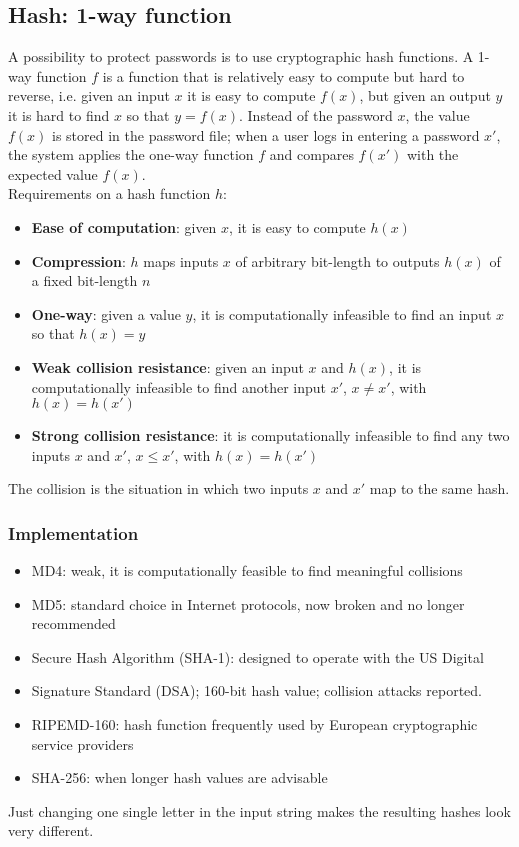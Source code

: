 \documentclass[a4paper, 10pt, titlepage]{article}
\begin{document}
\subsection{Hash: 1-way function}
A possibility to protect passwords is to use cryptographic hash functions. A 1-way function $f$ is a function that is relatively easy to compute but hard to reverse, i.e. given an input $x$ it is easy to compute $f(x)$, but given an output $y$ it is hard to find $x$ so that $y = f(x)$. Instead of the password $x$, the value $f(x)$ is stored in the password file; when a user logs in entering a password $x'$, the system applies the one-way function $f$ and compares $f(x')$ with the expected value $f(x)$.\\
Requirements on a hash function $h$:
\begin{itemize}
\item \textbf{Ease of computation}: given $x$, it is easy to compute $h(x)$
\item \textbf{Compression}: $h$ maps inputs $x$ of arbitrary bit-length to outputs $h(x)$ of a fixed bit-length $n$
\item \textbf{One-way}: given a value $y$, it is computationally infeasible to find an input $x$ so that $h(x) = y$
\item \textbf{Weak collision resistance}: given an input $x$ and $h(x)$, it is computationally infeasible to find another input $x'$, $x \neq x'$, with $h(x) = h(x')$
\item \textbf{Strong collision resistance}: it is computationally infeasible to find any two inputs $x$ and $x'$, $x \leq x'$, with $h(x) = h(x')$
\end{itemize}
The collision is the situation in which two inputs $x$ and $x'$ map to the same hash. 
\subsubsection{Implementation}
\begin{itemize}
\item MD4: weak, it is computationally feasible to find meaningful collisions
\item MD5: standard choice in Internet protocols, now broken and no longer recommended
\item Secure Hash Algorithm (SHA-1): designed to operate with the US Digital
\item Signature Standard (DSA); 160-bit hash value; collision attacks reported.
\item RIPEMD-160: hash function frequently used by European cryptographic service providers
\item SHA-256: when longer hash values are advisable
\end{itemize}
Just changing one single letter in the input string makes the resulting hashes look very different.
\end{document}

